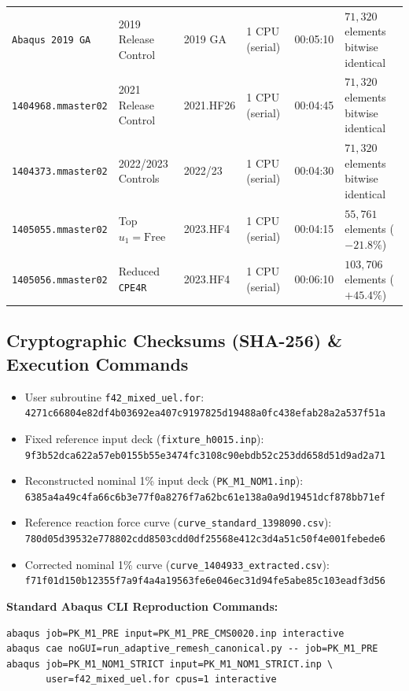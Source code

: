 \begin{table}[htbp]
\begin{tabularx}{\textwidth}{L{22mm} L{22mm} C{16mm} C{18mm} C{13mm} L{46mm}}
    \texttt{Abaqus 2019 GA} & 2019 Release Control & 2019 GA & 1 CPU (serial) & 00:05:10 & $71{,}320$ elements bitwise identical \\
    \texttt{1404968.mmaster02} & 2021 Release Control & 2021.HF26 & 1 CPU (serial) & 00:04:45 & $71{,}320$ elements bitwise identical \\
    \texttt{1404373.mmaster02} & 2022/2023 Controls & 2022/23 & 1 CPU (serial) & 00:04:30 & $71{,}320$ elements bitwise identical \\
    \texttt{1405055.mmaster02} & Top $u_1 = \mathrm{Free}$ & 2023.HF4 & 1 CPU (serial) & 00:04:15 & $55{,}761$ elements ($-21.8\%$) \\
    \texttt{1405056.mmaster02} & Reduced \texttt{CPE4R} & 2023.HF4 & 1 CPU (serial) & 00:06:10 & $103{,}706$ elements ($+45.4\%$) \\
    \bottomrule
  \end{tabularx}
\end{table}

\vspace{-0.5em}

\subsection{Cryptographic Checksums (SHA-256) \& Execution Commands}
{\scriptsize
\begin{itemize}[leftmargin=4mm,itemsep=0.5pt,topsep=1pt]
  \item User subroutine \texttt{f42\_mixed\_uel.for}: \texttt{4271c66804e82df4b03692ea407c9197825d19488a0fc438efab28a2a537f51a}
  \item Fixed reference input deck (\texttt{fixture\_h0015.inp}): \texttt{9f3b52dca622a57eb0155b55e3474fc3108c90ebdb52c253dd658d51d9ad2a71}
  \item Reconstructed nominal 1\% input deck (\texttt{PK\_M1\_NOM1.inp}): \texttt{6385a4a49c4fa66c6b3e77f0a8276f7a62bc61e138a0a9d19451dcf878bb71ef}
  \item Reference reaction force curve (\texttt{curve\_standard\_1398090.csv}): \texttt{780d05d39532e778802cdd8503cdd0df25568e412c3d4a51c50f4e001febede6}
  \item Corrected nominal 1\% curve (\texttt{curve\_1404933\_extracted.csv}): \texttt{f71f01d150b12355f7a9f4a4a19563fe6e046ec31d94fe5abe85c103eadf3d56}
\end{itemize}
}

\vspace{-0.4em}
{\footnotesize\textbf{Standard Abaqus CLI Reproduction Commands:}}
\begin{verbatim}
abaqus job=PK_M1_PRE input=PK_M1_PRE_CMS0020.inp interactive
abaqus cae noGUI=run_adaptive_remesh_canonical.py -- job=PK_M1_PRE
abaqus job=PK_M1_NOM1_STRICT input=PK_M1_NOM1_STRICT.inp \
       user=f42_mixed_uel.for cpus=1 interactive
\end{verbatim}

\vspace{-0.8em}
\renewcommand{\refname}{\normalsize References}
\setlength{\bibsep}{1.5pt}


